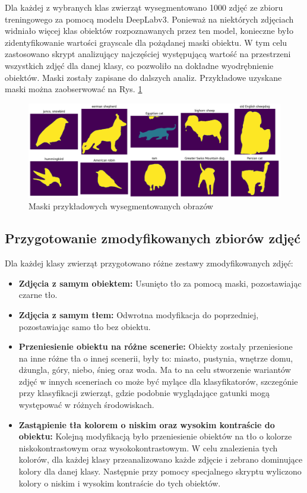 Dla każdej z wybranych klas zwierząt wysegmentowano 1000 zdjęć ze zbioru treningowego za pomocą modelu DeepLabv3. Ponieważ na niektórych zdjęciach widniało więcej klas obiektów rozpoznawanych przez ten model, konieczne było zidentyfikowanie 
wartości grayscale dla pożądanej maski obiektu. W tym celu zastosowano skrypt analizujący najczęściej występującą wartość na przestrzeni wszystkich zdjęć dla danej klasy, co pozwoliło na dokładne wyodrębnienie obiektów. Maski zostały zapisane 
do dalszych analiz. Przykładowe uzyskane maski można zaobserwować na Rys. \ref{rys:masks}

\begin{figure}
	\centering\includegraphics[width=.9\textwidth]{img/masks}
	\caption{Maski przykładowych wysegmentowanych obrazów}  \label{rys:masks}
\end{figure}

\subsection*{Przygotowanie zmodyfikowanych zbiorów zdjęć}

Dla każdej klasy zwierząt przygotowano różne zestawy zmodyfikowanych zdjęć:
\begin{itemize}
    \item \textbf{Zdjęcia z samym obiektem:} Usunięto tło za pomocą maski, pozostawiając czarne tło.
    \item \textbf{Zdjęcia z samym tłem:} Odwrotna modyfikacja do poprzedniej, pozostawiając samo tło bez obiektu. 
    \item \textbf{Przeniesienie obiektu na różne scenerie:} Obiekty zostały przeniesione na inne różne tła o innej scenerii, były to: miasto, pustynia, wnętrze domu, dżungla, góry, niebo, śnieg oraz woda. Ma to na celu stworzenie wariantów 
    zdjęć w innych sceneriach co może być mylące dla klasyfikatorów, szczegónie przy klasyfikacji zwierząt, gdzie podobnie wyglądające gatunki mogą występować w różnych środowiskach. 
    \item \textbf{Zastąpienie tła kolorem o niskim oraz wysokim kontraście do obiektu:} Kolejną modyfikacją było przeniesienie obiektów na tło o kolorze niskokontrastowym oraz wysokokontrastowym. W celu znalezienia tych kolorów, dla każdej klasy 
    przeanalizowano każde zdjęcie i zebrano dominujące kolory dla danej klasy. Następnie przy pomocy specjalnego skryptu wyliczono kolory o niskim i wysokim kontraście do tych obiektów. 
\end{itemize}

